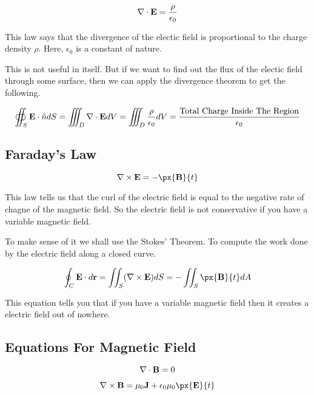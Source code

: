 $$ \nabla \cdot {\bf E} = \frac{\rho}{\epsilon_0} $$

This law says that the divergence of the electic field is proportional to the charge density $\rho$.
Here, $\epsilon_0$ is a constant of nature.

This is not useful in itself.
But if we want to find out the flux of the electic field through some surface, 
then we can apply the divergence theorem to get the following.

$$ 
\oiint_S {\bf E} \cdot \hat{n} dS 
    = \iiint_D \nabla \cdot {\bf E} dV 
    = \iiint_D \frac{\rho}{\epsilon_0} dV 
    = \frac{\text{Total Charge Inside The Region}}{\epsilon_0}
$$


\subsection{Faraday's Law}

$$ \nabla \times {\bf E} = - \px{{\bf B}}{t} $$

This law tells us that the curl of the electric field is equal to the negative rate of chagne of the magnetic field.
So the electric field is not conservative if you have a variable magnetic field. 

To make sense of it we shall use the Stokes' Theorem.
To compute the work done by the electric field along a closed curve.

$$
\oint_C {\bf E} \cdot d{\bf r}
    = \iint_S (\nabla \times {\bf E}) dS 
    = - \iint_S \px{{\bf B}}{t} dA
$$

This equation tells you that if you have a variable magnetic field then it creates a electric field out of nowhere.

\subsection{Equations For Magnetic Field}

$$ \nabla \cdot {\bf B} = 0 $$

$$ \nabla \times {\bf B} = \mu_0 {\bf J} + \epsilon_0 \mu_0 \px{{\bf E}}{t} $$